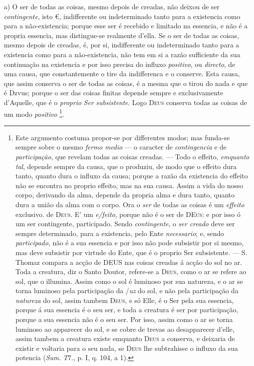 a) O ser de todas as coisas, mesmo depois de creadas, não deixou de ser \emph{contingente}, isto €, indifferente ou indeterminado tanto para a existencia como para a não-existencia; porque esse ser é recebido e limitado na essencia, e não é a propria essencia, mas distingue-se realmente d'ella. Se o ser de todas as coisas, mesmo depois de creadas, é, por si, indifferente ou indeterminado tanto para a existencia como para a não-existencia, não tem em si a razão sufficiente da sua continuação na existencia e por isso precisa do influxo \emph{positivo}, ou \emph{directo}, de uma causa, que constantemente o tire da indifferenca e o conserve. Esta causa, que assim conserva o ser de todas as coisas, é a mesma que o tirou do nada e que é Dzvus; porque o ser das coisas finitas depende sempre e exclusivamente d'Aquelle, que é o \emph{proprio Ser subsistente}. Logo \textsc{Deus} conserva todas as coisas de um modo \emph{positivo} \footnote{Este argumento costuma propor-se por differentes modos; mas funda-se sempre sobre o mesmo \emph{fermo medio} --- o caracter de \emph{contingencia} e de \emph{participação}, que revelam todas as coisas creadas. --- Todo o effeito, \emph{emquanto tal}, depende sempre da causa, que o produziu, de modo que o effeito dura tanto, quanto dura o influxo da causa; porque a razão da existencia do effeito não se encontra no proprio effeito, mas na sua causa. Assim a vida do nosso corpo, derivando da alma, depende da propria alma e dura tanto, quanto dura a união da alma com o corpo. Ora o \emph{ser} de todas as coisas é um \emph{effeito} exclusivo. de \textsc{Deus}. E' um \emph{e/feito}, porque não é o ser de \textsc{DEus}: e por isso ó um ser contingente, participado. Sendo \emph{contingente}, o \emph{ser creado} deve ser sempre determinado, para a existencia, pelo Ente \emph{necessario}; e, sendo \emph{participado}, não é a sua essencia e por isso não pode subsistir por si mesmo, mas deve subsistir por virtude do Ente, que é o proprio Ser subsistente. --- S. Thomaz compara a acção de \textsc{DEUS} nas coisas creadas á acção do sol no ar. Toda a creatura, diz o Santo Doutor, refere-se a \textsc{Deus}, como o ar se refere ao sol, que o illumina. Assim como o sol é luminoso por sua natureza, e o ar se torna luminoso pela participação da /\emph{uz} do sol, e não pela participação da \emph{natureza} do sol, assim tambem \textsc{Deus}, e só Elle, é o Ser pela sua essencia, porque á sua essencia é o seu ser, e toda a creatura é ser por participação, porque a sua essencia não é o seu ser. Por isso, assim como o ar se torna luminoso ao apparecer do sol, e se cobre de trevas ao desapparecer d'elle, assim tambem a creatura existe emquanto \textsc{Deus} a conserva, e deixaria de existir e voltaria para o seu nada, se \textsc{Deus} lhe subtrahisse o influxo da sua potencia (\emph{Sum}. \emph{T}7., p. I, q. 104, a 1).}.


